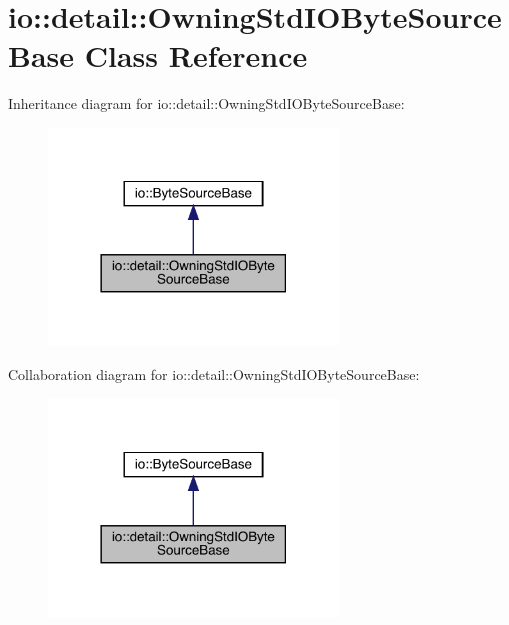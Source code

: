 \hypertarget{classio_1_1detail_1_1_owning_std_i_o_byte_source_base}{}\section{io\+:\+:detail\+:\+:Owning\+Std\+I\+O\+Byte\+Source\+Base Class Reference}
\label{classio_1_1detail_1_1_owning_std_i_o_byte_source_base}


Inheritance diagram for io\+:\+:detail\+:\+:Owning\+Std\+I\+O\+Byte\+Source\+Base\+:\nopagebreak
\begin{figure}[H]
\begin{center}
\leavevmode
\includegraphics[width=218pt]{classio_1_1detail_1_1_owning_std_i_o_byte_source_base__inherit__graph}
\end{center}
\end{figure}


Collaboration diagram for io\+:\+:detail\+:\+:Owning\+Std\+I\+O\+Byte\+Source\+Base\+:\nopagebreak
\begin{figure}[H]
\begin{center}
\leavevmode
\includegraphics[width=218pt]{classio_1_1detail_1_1_owning_std_i_o_byte_source_base__coll__graph}
\end{center}
\end{figure}
